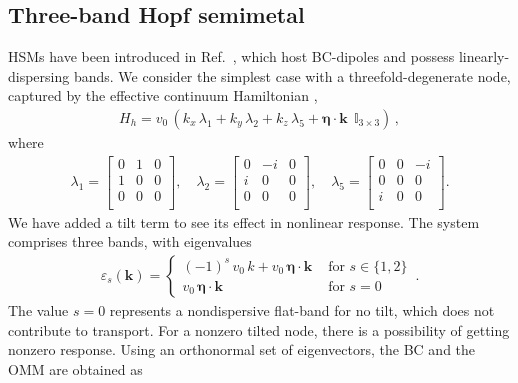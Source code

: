 \documentclass[aps,prb,onecolumn,nofootinbib,citeautoscript,10pt]{revtex4-2}
\newcommand{\bs}[1]{\boldsymbol{#1}}
\begin{document}
\subsection{Three-band Hopf semimetal}
\label{sechopf}

HSMs have been introduced in Ref.~\cite{graf-hopf}, which host BC-dipoles and possess linearly-dispersing bands. We consider the simplest case with a threefold-degenerate node, captured by the effective continuum Hamiltonian \cite{graf-hopf, hopf2, hopf3},
\begin{align}
\label{eqbcd2}
H_{h} =  v_0 \,(k_x \,\lambda_1 + k_y \,\lambda_2+ k_z\,\lambda_5 +{\bs \eta} \cdot {\bs k} \;\,\mathbb{I}_{3 \times 3})\,,
\end{align}
where
\begin{align}
\lambda_1 =  \begin{bmatrix}
 0 & 1 & 0 \\
 1 & 0 & 0 \\
 0 & 0 & 0 \\
\end{bmatrix}, \quad
\lambda_2 = \begin{bmatrix}
 0 & -i & 0 \\
 i & 0 & 0 \\
 0 & 0 & 0 \\
\end{bmatrix}, \quad
\lambda_5 = \begin{bmatrix}
 0 & 0 & -i \\
 0 & 0 & 0 \\
 i & 0 & 0 \\
\end{bmatrix} .
\end{align}
We have added a tilt term to see its effect in nonlinear response. The system comprises three bands, with eigenvalues
\begin{align}
\label{eqevhopf}
\varepsilon_ s  ({ \boldsymbol k})=  \begin{cases}
(-1)^s \, v_0 \,k + v_0 \,{\bs \eta} \cdot {\bs k} & \text{ for } s \in \lbrace 1,2 \rbrace
\\ v_0 \,{\bs \eta} \cdot {\bs k} & \text{ for } s=0
\end{cases}\,.
\end{align}
The value $s=0$ represents a nondispersive flat-band for no tilt, which does not contribute to transport. For a nonzero tilted node, there is a possibility of getting nonzero response. Using an orthonormal set of eigenvectors, the BC and the OMM are obtained as
\end{document}
